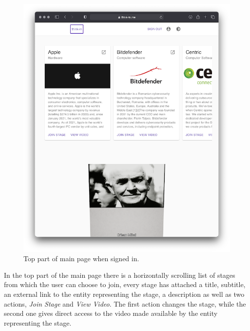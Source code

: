 \begin{figure}[H]
	\includegraphics[width=\textwidth,keepaspectratio]{images/business_logic/main_page_signed_in_top.png}
	\caption{Top part of main page when signed in.}
	\label{figure:website-main-page-top}
\end{figure}

In the top part of the main page there is a horizontally scrolling list of stages from which the user can choose to join, every stage has attached a title, subtitle, an external link to the entity representing the stage, a description as well as two actions, \textit{Join Stage} and \textit{View Video}. The first action changes the stage, while the second one gives direct access to the video made available by the entity representing the stage.

